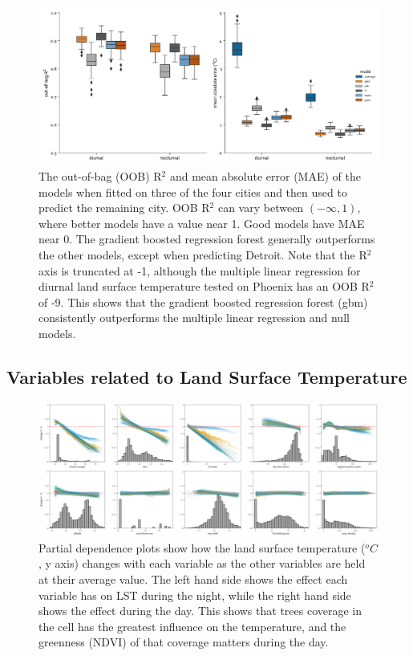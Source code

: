 \documentclass[]{elsarticle}
\begin{document}
\begin{figure}
    \centering
    \includegraphics[width=\linewidth]{fig/report/holdout_results_500.pdf}
    \caption{
    The out-of-bag (OOB) R$^2$ and mean absolute error (MAE) of the models when fitted on three of the four cities and then used to predict the remaining city. OOB R$^2$ can vary between $(-\infty, 1)$, where better models have a value near 1. Good models have MAE near 0. The gradient boosted regression forest generally outperforms the other models, except when predicting Detroit. Note that the R$^2$ axis is truncated at -1, although the multiple linear regression for diurnal land surface temperature tested on Phoenix has an OOB R$^2$ of -9.  This shows that the gradient boosted regression forest (gbm) consistently outperforms the multiple linear regression and null models.
    }
    \label{fig:holdout_results}
\end{figure}

\subsection{Variables related to Land Surface Temperature}

\begin{figure}
    \centering
    \includegraphics[width=\linewidth]{fig/report/pdp_uncert_night.png}
    \caption{
    Partial dependence plots show how the land surface temperature ($^oC$, y axis) changes with each variable as the other variables are held at their average value. The left hand side shows the effect each variable has on LST during the night, while the right hand side shows the effect during the day. This shows that trees coverage in the cell has the greatest influence on the temperature, and the greenness (NDVI) of that coverage matters during the day.
    }
    \label{fig:pdp_night}
\end{figure}
\end{document}
